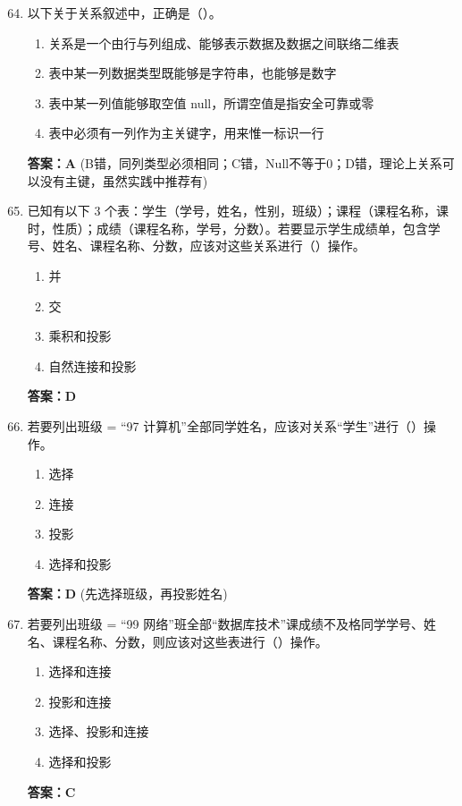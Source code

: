 \documentclass[12pt, a4paper]{article}
\begin{document}
\begin{enumerate}[label=\arabic*.]
    \setcounter{enumi}{63}
    \item 以下关于关系叙述中，正确是（\quad）。
    \begin{enumerate}
        \item 关系是一个由行与列组成、能够表示数据及数据之间联络二维表
        \item 表中某一列数据类型既能够是字符串，也能够是数字
        \item 表中某一列值能够取空值 null，所谓空值是指安全可靠或零
        \item 表中必须有一列作为主关键字，用来惟一标识一行
    \end{enumerate}
    \textbf{答案：A} (B错，同列类型必须相同；C错，Null不等于0；D错，理论上关系可以没有主键，虽然实践中推荐有)

    \item 已知有以下 3 个表：学生（学号，姓名，性别，班级）；课程（课程名称，课时，性质）；成绩（课程名称，学号，分数）。若要显示学生成绩单，包含学号、姓名、课程名称、分数，应该对这些关系进行（\quad）操作。
    \begin{enumerate}
        \item 并
        \item 交
        \item 乘积和投影
        \item 自然连接和投影
    \end{enumerate}
    \textbf{答案：D}

    \item 若要列出班级 = “97 计算机”全部同学姓名，应该对关系“学生”进行（\quad）操作。
    \begin{enumerate}
        \item 选择
        \item 连接
        \item 投影
        \item 选择和投影
    \end{enumerate}
    \textbf{答案：D} (先选择班级，再投影姓名)

    \item 若要列出班级 = “99 网络”班全部“数据库技术”课成绩不及格同学学号、姓名、课程名称、分数，则应该对这些表进行（\quad）操作。
    \begin{enumerate}
        \item 选择和连接
        \item 投影和连接
        \item 选择、投影和连接
        \item 选择和投影
    \end{enumerate}
    \textbf{答案：C}


\end{enumerate}
\end{document}

